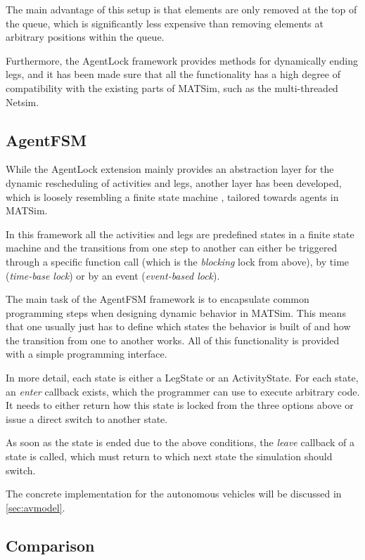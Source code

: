 The main advantage of this setup is that elements are only removed at the top
of the queue, which is significantly less expensive than removing elements at
arbitrary positions within the queue.

Furthermore, the AgentLock framework provides methods for dynamically ending legs,
and it has been made sure that all the functionality has a high degree of compatibility
with the existing parts of MATSim, such as the multi-threaded Netsim.

\subsection{AgentFSM}

While the AgentLock extension mainly provides an abstraction layer for the dynamic
rescheduling of activities and legs, another layer has been developed, which is
loosely resembling a finite state machine \citep[pp. 256]{FSM13}, tailored towards agents in
MATSim.

In this framework all the activities and legs are predefined states in a finite
state machine and the transitions from one step to another can either be triggered
through a specific function call (which is the \textit{blocking} lock from above), by time (\textit{time-base lock})
or by an event (\textit{event-based lock}).

The main task of the AgentFSM framework is to encapsulate common programming steps
when designing dynamic behavior in MATSim. This means that one usually just has
to define which states the behavior is built of and how the transition from one
to another works. All of this functionality is provided with a simple programming
interface.

In more detail, each state is either a LegState or an ActivityState. For each state,
an \textit{enter} callback exists, which the programmer can use to execute arbitrary
code. It needs to either return how this state is locked from the three options above or
issue a direct switch to another state.

As soon as the state is ended due to the above conditions, the \textit{leave} callback
of a state is called, which must return to which next state the simulation should
switch.

The concrete implementation for the autonomous vehicles will be discussed in \cref{sec:avmodel}.

\subsection{Comparison}

